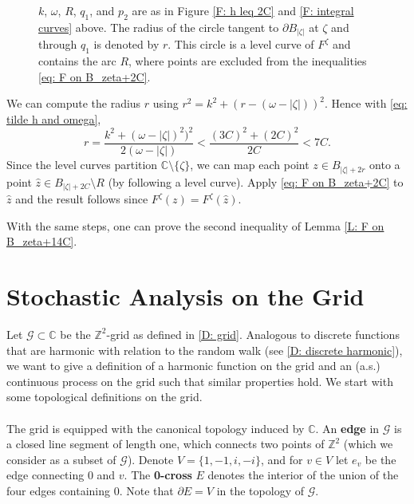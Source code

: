 \documentclass[11pt]{article}
\makeatletter
\renewenvironment{proof}[1][\proofname]{
   \par\pushQED{\qed}\normalfont
   \topsep6\p@\@plus6\p@\relax
   \trivlist\item[\hskip\labelsep\bfseries#1\@addpunct{.}]
   \ignorespaces
}{
   \popQED\endtrivlist\@endpefalse
}
\numberwithin{equation}{section}
\makeatother
\begin{document}
\begin{proof}
\begin{figure}[H]
    \caption{$k$, $\omega$, $R$, $q_1$, and $p_2$ are as in Figure \ref{F: h leq 2C} 
      and \ref{F: integral curves} above. 
      The radius of the circle tangent to $\partial B_{|\zeta|}$ at $\zeta$ 
      and through $q_1$ is denoted by $r$. 
      This circle is a level curve of $F^{\zeta}$ 
      and contains the arc $R$, 
      where points are excluded from the inequalities \eqref{eq: F on B_zeta+2C}.}
    \label{F: level curve over R}
  \end{figure}
  \vspace*{-3mm}
  We can compute the radius $r$ using $r^2 = k^2 + (r-(\omega - |\zeta|))^2$.
  Hence with \eqref{eq: tilde h and omega}, 
  \begin{equation}\nonumber
    r = \frac{k^2 + (\omega - |\zeta|)^2)^2}{2(\omega - |\zeta|)}
      < \frac{(3C)^2 + (2C)^2}{2C} 
      < 7C.
  \end{equation}
  Since the level curves 
  partition $\mathbb{C} \setminus \{\zeta\}$, we can map  
  each point $z \in B_{|\zeta| + 2r}$ onto a 
  point $\hat{z} \in B_{|\zeta| + 2C} \setminus R$ (by following a level curve). 
  Apply \eqref{eq: F on B_zeta+2C} to $\hat{z}$ and 
  the result follows since $F^{\zeta}(z) = F^{\zeta}(\hat{z})$.

  With the same steps, one can prove the second inequality 
  of Lemma \ref{L: F on B_zeta+14C}. 
\end{proof}



\section{Stochastic Analysis on the Grid}
\label{sec: stoch analysis on the grid}
Let $\mathcal{G} \subset \mathbb{C}$ be the $\mathbb{Z}^2$-grid as defined in \eqref{D: grid}. 
Analogous to discrete functions that are harmonic 
with relation to the random walk (see \eqref{D: discrete harmonic}), 
we want to give a definition of 
a harmonic function on the grid and 
an (a.s.) continuous process on
the grid such that similar properties hold. 
We start with some topological definitions on the grid.\\~\\
The grid is equipped with the canonical topology induced by $\mathbb{C}$.
An \textbf{edge} in $\mathcal{G}$ 
is a closed line segment of length one, which connects two points of 
$\mathbb{Z}^2$ (which we consider as a subset of $\mathcal{G}$).
Denote $V = \{1,-1, i, -i\}$, 
and for $v \in V$ let $e_v \label{D: edge e_v}$ be the edge connecting $0$ and $v$. 
The \mbox{\textbf{0-cross}} $E \label{D: E}$ denotes
the interior of the union of the four edges containing $0$.
Note that $\partial E = V$ in the topology of $\mathcal{G}$.
\end{document}
